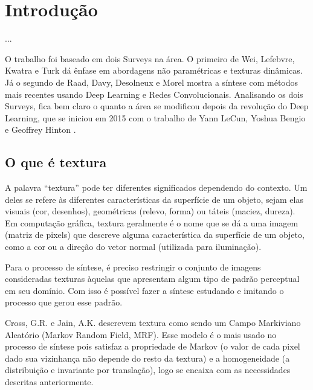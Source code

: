 \chapter{Introdução}


...





O trabalho foi baseado em dois Surveys
na área. O primeiro de Wei, Lefebvre, Kwatra
e Turk \cite{Wei2009} dá ênfase em
abordagens não paramétricas e texturas
dinâmicas. Já o segundo de Raad, Davy, 
Desolneux e Morel \cite{Raad2018} mostra
a síntese com métodos mais recentes
usando Deep Learning e Redes Convolucionais.
Analisando os dois Surveys, fica bem claro o 
quanto a área se modificou depois da
revolução do Deep Learning, que se iniciou
em 2015 com o trabalho de Yann LeCun, 
Yoshua Bengio e Geoffrey Hinton \cite{LeCun2015}.

\section{O que é textura}



A palavra ``textura'' pode ter diferentes significados
dependendo do contexto.
Um deles se refere às
diferentes características da superfície de um objeto,
sejam elas visuais (cor, desenhos), geométricas (relevo,
forma) ou táteis (maciez, dureza). 
Em computação gráfica, textura geralmente é
o nome que se dá a uma imagem (matriz de pixels)
que descreve alguma
característica da superfície de um objeto,
como a cor ou a direção do vetor normal (utilizada
para iluminação).


Para o processo de síntese, é preciso restringir o
conjunto de imagens consideradas texturas àquelas
que apresentam algum tipo de padrão perceptual
em seu domínio. Com isso é possível fazer a síntese
estudando e imitando o processo que gerou esse padrão.


Cross, G.R. e Jain, A.K. \cite{Cross1983} descrevem
textura como sendo um Campo Markiviano Aleatório
(Markov Random Field, MRF). Esse modelo é o mais
usado no processo de síntese pois satisfaz a propriedade
de Markov (o valor de cada pixel dado sua vizinhança não
depende do resto da textura) e a homogeneidade (a
distribuição e invariante por translação), logo
se encaixa com as necessidades descritas anteriormente.



